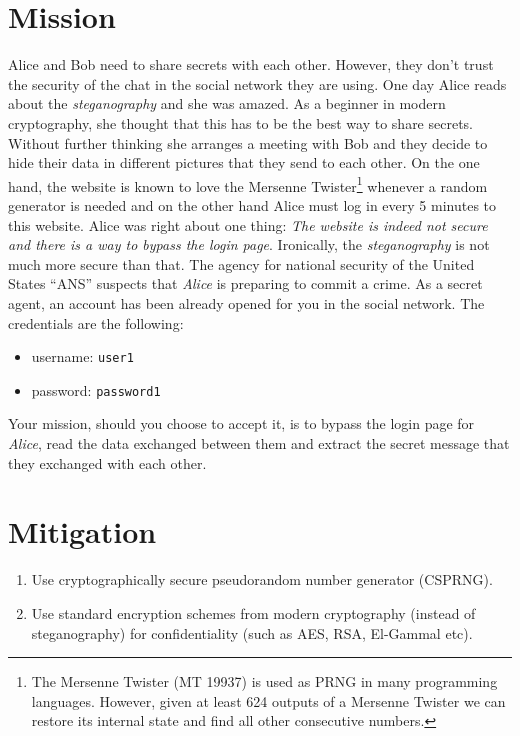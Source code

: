 \documentclass[11pt]{article}
\begin{document}
\section{Mission}
Alice and Bob need to share secrets with each other. However, they don't trust the security of the chat in the social network they are using. One day Alice reads about the \textit{steganography} and she was amazed. As a beginner in modern cryptography, she thought that this has to be the best way to share secrets. Without further thinking she arranges a meeting with Bob and they decide to hide their data in different pictures that they send to each other. On the one hand, the website is known to love the Mersenne Twister\footnote{The Mersenne Twister (MT 19937) is used as PRNG in many programming languages. However, given at least 624 outputs of a Mersenne Twister we can restore its internal state and find all other consecutive numbers.} whenever a random generator is needed and on the other hand Alice must log in every 5 minutes to this website. Alice was right about one thing: \textit{The website is indeed not secure and there is a way to bypass the login page}. Ironically, the \textit{steganography} is not much more secure than that. The agency for national security of the United States ``ANS'' suspects that \textit{Alice} is preparing to commit a crime. As a secret agent, an account has been already opened for you in the social network. The credentials are the following:
\begin{itemize}
	\item username: \texttt{user1}
	\item password: \texttt{password1}
\end{itemize}
Your mission, should you choose to accept it, is to bypass the login page for \textit{Alice}, read the data exchanged between them and extract the secret message that they exchanged with each other.

\section{Mitigation}
\begin{enumerate}
\item Use cryptographically secure pseudorandom number generator (CSPRNG).
\item Use standard encryption schemes from modern cryptography (instead of steganography) for confidentiality (such as AES, RSA, El-Gammal etc).
\end{enumerate}
\end{document}
